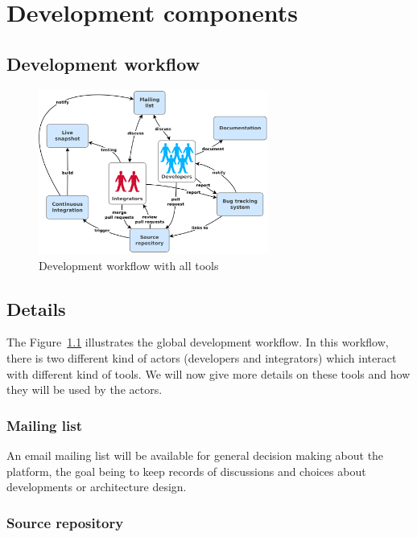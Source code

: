 \chapter{Development components}
\label{ch:development-components}

\section{Development workflow}
\label{sec:development-workflow}

\begin{figure}
\centering
\includegraphics[width=0.67\textwidth]{images/development-workflow.png}
\caption{Development workflow with all tools}
\label{fig:development-workflow}
\end{figure}

\section{Details}
\label{sec:details}

The Figure~\ref{fig:development-workflow} illustrates the global development workflow.
In this workflow, there is two different kind of actors (developers and integrators) which
interact with different kind of tools.
We will now give more details on these tools and how they will be used by the actors.

\subsection{Mailing list}
\label{sec:mailing-list}

An email mailing list will be available for general decision making about the platform,
the goal being to keep records of discussions and choices about developments or architecture design.

\subsection{Source repository}
\label{sec:source-repository}

